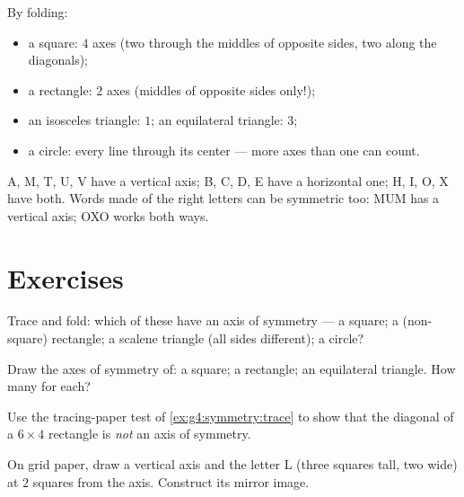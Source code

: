 \begin{example}\label{ex:g4:symmetry:shapes}
By folding:
\begin{itemize}
  \item a square: $4$ axes (two through the middles of opposite
        sides, two along the diagonals);
  \item a rectangle: $2$ axes (middles of opposite sides only!);
  \item an isosceles triangle: $1$; an equilateral triangle: $3$;
  \item a circle: every line through its center --- more axes than
        one can count.
\end{itemize}
\end{example}

\begin{example}\label{ex:g4:symmetry:letters}
A, M, T, U, V have a vertical axis; B, C, D, E have a horizontal
one; H, I, O, X have both. Words made of the right letters can be
symmetric too: MUM has a vertical axis; OXO works both ways.
\end{example}

\section{Exercises}

\begin{exercise}[$\star$]\label{exo:g4:symmetry:1}
Trace and fold: which of these have an axis of symmetry --- a
square; a (non-square) rectangle; a scalene triangle (all sides
different); a circle?
\end{exercise}

\begin{exercise}[$\star$]\label{exo:g4:symmetry:2}
Draw the axes of symmetry of: a square; a rectangle; an equilateral
triangle. How many for each?
\end{exercise}

\begin{exercise}[$\star$]\label{exo:g4:symmetry:3}
Use the tracing-paper test of \cref{ex:g4:symmetry:trace} to show
that the diagonal of a $6 \times 4$ rectangle is \emph{not} an axis
of symmetry.
\end{exercise}

\begin{exercise}[$\star$]\label{exo:g4:symmetry:4}
On grid paper, draw a vertical axis and the letter L (three squares
tall, two wide) at $2$ squares from the axis. Construct its mirror
image.
\end{exercise}

